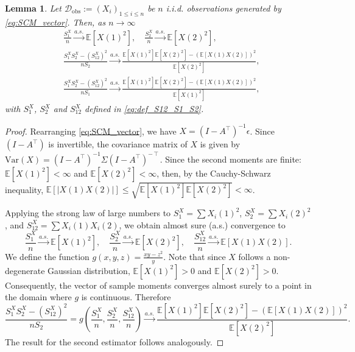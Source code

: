 \documentclass[accepted]{uai2026} %
\newcommand{\train}{\mathcal{D}}
\newcommand{\obsdata}{\train_{\text{obs}}}
\def\transpose{\intercal}
\newtheorem{lemma}{Lemma}[section]
\theoremstyle{boldremark}
\begin{document}
\begin{lemma}
    \label{lemma:conv_nonident}
    Let $\obsdata := (X_i)_{1\leq i\leq n}$ be $n$ i.i.d. observations generated by \eqref{eq:SCM_vector}. Then, as $n\to \infty$
    \begin{align}
        &\frac{S_1^X}{n} \xrightarrow{a.s.} \mathbb{E}[X(1)^2], \quad \frac{S_2^X}{n} \xrightarrow{a.s.} \mathbb{E}[X(2)^2], \\
        &\frac{S_1^X S_2^X - (S_{12}^X)^2}{n S_2} \xrightarrow{a.s.} \frac{\mathbb{E}[X(1)^2]\mathbb{E}[X(2)^2] - (\mathbb{E}[X(1)X(2)])^2}{\mathbb{E}[X(2)^2]}, \\
        &\frac{S_1^X S_2^X - (S_{12}^X)^2}{n S_1} \xrightarrow{a.s.} \frac{\mathbb{E}[X(1)^2]\mathbb{E}[X(2)^2] - (\mathbb{E}[X(1)X(2)])^2}{\mathbb{E}[X(1)^2]},
    \end{align}
    with $S_1^X$, $S_2^X$ and $S_{12}^X$ defined in \eqref{eq:def_S12_S1_S2}.
\end{lemma}

\begin{proof}
    Rearranging \eqref{eq:SCM_vector}, we have $X = (I - A^\transpose)^{-1}\epsilon$. Since $(I - A^\transpose)$ is invertible, the covariance matrix of $X$ is given by $\text{Var}(X) = (I - A^\transpose)^{-1}\Sigma (I - A^\transpose)^{-\transpose}$. Since the second moments are finite: $\mathbb{E}[X(1)^2] < \infty$ and $\mathbb{E}[X(2)^2] < \infty$, then, by the Cauchy-Schwarz inequality, $\mathbb{E}[|X(1)X(2)|] \leq \sqrt{\mathbb{E}[X(1)^2]\mathbb{E}[X(2)^2]} < \infty$.
    
    Applying the strong law of large numbers to $S^X_1 = \sum X_i(1)^2$, $S^X_2 = \sum X_i(2)^2$, and $S^X_{12} = \sum X_i(1)X_i(2)$, we obtain almost sure (a.s.) convergence to 
    $$ 
    \frac{S_1^X}{n} \xrightarrow{a.s.} \mathbb{E}[X(1)^2], \quad \frac{S_2^X}{n} \xrightarrow{a.s.} \mathbb{E}[X(2)^2], \quad \frac{S_{12}^X}{n} \xrightarrow{a.s.} \mathbb{E}[X(1)X(2)]. 
    $$
    We define the function $g(x, y, z) = \frac{xy - z^2}{y}$. Note that since $X$ follows a non-degenerate Gaussian distribution, $\mathbb{E}[X(1)^2] > 0$ and $\mathbb{E}[X(2)^2] > 0$. Consequently, the vector of sample moments converges almost surely to a point in the domain where $g$ is continuous. Therefore
    $$
    \frac{S_1^X S_2^X - (S_{12}^X)^2}{n S_2} = g\left(\frac{S_1^X}{n}, \frac{S_2^X}{n}, \frac{S_{12}^X}{n}\right) \xrightarrow{a.s.} \frac{\mathbb{E}[X(1)^2]\mathbb{E}[X(2)^2] - (\mathbb{E}[X(1)X(2)])^2}{\mathbb{E}[X(2)^2]}.
    $$
    The result for the second estimator follows analogously.
\end{proof}
\end{document}
